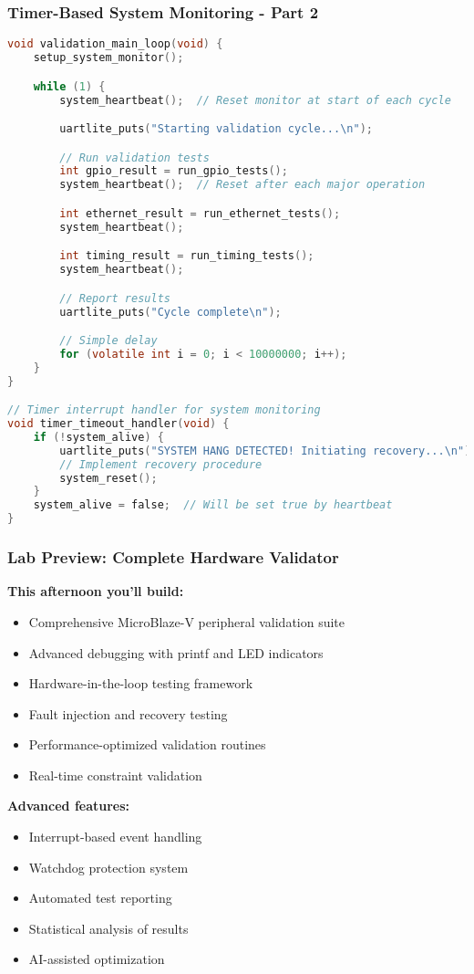 \documentclass{beamer}
\begin{document}
\begin{frame}[fragile]
\frametitle{Timer-Based System Monitoring - Part 2}
\begin{lstlisting}[language=C, basicstyle=\fontsize{5}{5}\selectfont\ttfamily, backgroundcolor={}]
void validation_main_loop(void) {
    setup_system_monitor();

    while (1) {
        system_heartbeat();  // Reset monitor at start of each cycle

        uartlite_puts("Starting validation cycle...\n");

        // Run validation tests
        int gpio_result = run_gpio_tests();
        system_heartbeat();  // Reset after each major operation

        int ethernet_result = run_ethernet_tests();
        system_heartbeat();

        int timing_result = run_timing_tests();
        system_heartbeat();

        // Report results
        uartlite_puts("Cycle complete\n");

        // Simple delay
        for (volatile int i = 0; i < 10000000; i++);
    }
}

// Timer interrupt handler for system monitoring
void timer_timeout_handler(void) {
    if (!system_alive) {
        uartlite_puts("SYSTEM HANG DETECTED! Initiating recovery...\n");
        // Implement recovery procedure
        system_reset();
    }
    system_alive = false;  // Will be set true by heartbeat
}
\end{lstlisting}
\end{frame}

\begin{frame}
\frametitle{Lab Preview: Complete Hardware Validator}
\textbf{This afternoon you'll build:}
\begin{itemize}
    \item \footnotesize Comprehensive MicroBlaze-V peripheral validation suite
    \item \footnotesize Advanced debugging with printf and LED indicators
    \item \footnotesize Hardware-in-the-loop testing framework
    \item \footnotesize Fault injection and recovery testing
    \item \footnotesize Performance-optimized validation routines
    \item \footnotesize Real-time constraint validation
\end{itemize}

\vspace{0.2cm}
\textbf{Advanced features:}
\begin{itemize}
    \item \footnotesize Interrupt-based event handling
    \item \footnotesize Watchdog protection system
    \item \footnotesize Automated test reporting
    \item \footnotesize Statistical analysis of results
    \item \footnotesize AI-assisted optimization
\end{itemize}
\end{frame}
\end{document}

